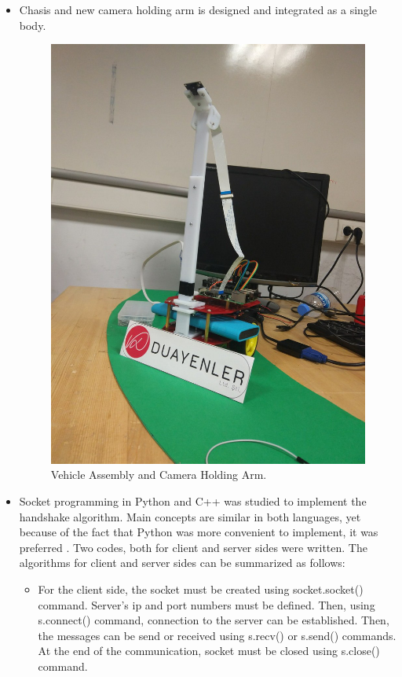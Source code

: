 \documentclass[a4paper,12pt]{article}
\begin{document}
\begin{itemize}
\newpage
	\item Chasis and new camera holding arm is designed and integrated as a single body. 
	\begin{figure}[H]
	\center
	\setlength{\unitlength}{\textwidth} 
	\includegraphics[width=0.75\unitlength]{carAssembled.jpg}
	\caption{\label{fig:carAssembled} Vehicle Assembly and Camera Holding Arm.}
	\end{figure}
	\item Socket programming in Python and C++ was studied to implement the handshake algorithm. Main concepts are similar in both languages, yet because of the fact that Python was more convenient to implement, it was preferred . Two codes, both for client and server sides were written. The algorithms for client and server sides can be summarized as follows:
	\begin{itemize}
		\item For the client side, the socket must be created using socket.socket() command. Server's ip and port numbers must be defined. Then, using s.connect() command, connection to the server can be established. Then, the messages can be send or received using s.recv() or s.send() commands. At the end of the communication, socket must be closed using s.close() command.

\end{itemize}
\end{itemize}
\end{document}
